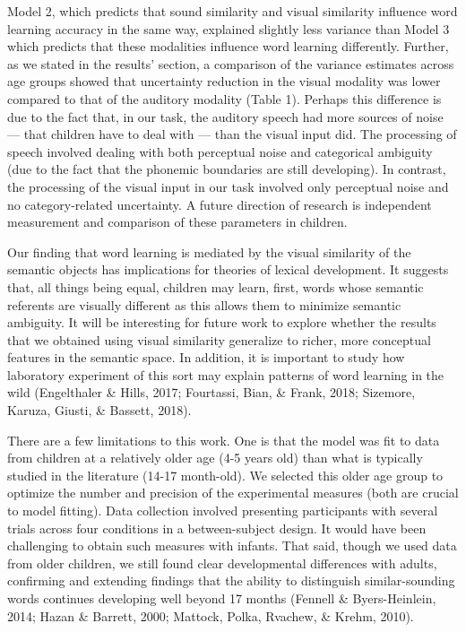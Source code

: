 \documentclass[english,,man,floatsintext]{apa6}
\theoremstyle{definition}
\theoremstyle{definition}
\theoremstyle{definition}
\theoremstyle{remark}
\begin{document}
Model 2, which predicts that sound similarity and visual similarity
influence word learning accuracy in the same way, explained slightly
less variance than Model 3 which predicts that these modalities
influence word learning differently. Further, as we stated in the
results' section, a comparison of the variance estimates across age
groups showed that uncertainty reduction in the visual modality was
lower compared to that of the auditory modality (Table 1). Perhaps this
difference is due to the fact that, in our task, the auditory speech had
more sources of noise --- that children have to deal with --- than the
visual input did. The processing of speech involved dealing with both
perceptual noise and categorical ambiguity (due to the fact that the
phonemic boundaries are still developing). In contrast, the processing
of the visual input in our task involved only perceptual noise and no
category-related uncertainty. A future direction of research is
independent measurement and comparison of these parameters in children.

Our finding that word learning is mediated by the visual similarity of
the semantic objects has implications for theories of lexical
development. It suggests that, all things being equal, children may
learn, first, words whose semantic referents are visually different as
this allows them to minimize semantic ambiguity. It will be interesting
for future work to explore whether the results that we obtained using
visual similarity generalize to richer, more conceptual features in the
semantic space. In addition, it is important to study how laboratory
experiment of this sort may explain patterns of word learning in the
wild (Engelthaler \& Hills, 2017; Fourtassi, Bian, \& Frank, 2018;
Sizemore, Karuza, Giusti, \& Bassett, 2018).

There are a few limitations to this work. One is that the model was fit
to data from children at a relatively older age (4-5 years old) than
what is typically studied in the literature (14-17 month-old). We
selected this older age group to optimize the number and precision of
the experimental measures (both are crucial to model fitting). Data
collection involved presenting participants with several trials across
four conditions in a between-subject design. It would have been
challenging to obtain such measures with infants. That said, though we
used data from older children, we still found clear developmental
differences with adults, confirming and extending findings that the
ability to distinguish similar-sounding words continues developing well
beyond 17 months (Fennell \& Byers-Heinlein, 2014; Hazan \& Barrett,
2000; Mattock, Polka, Rvachew, \& Krehm, 2010).
\end{document}
